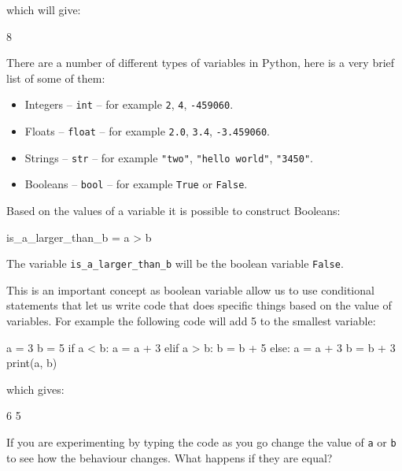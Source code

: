 which will give:

\begin{pyout}
8
\end{pyout}

There are a number of different types of variables in Python, here is a very
brief list of some of them:

\begin{itemize}
    \item Integers -- \texttt{int} -- for example \texttt{2},
        \texttt{4}, \texttt{-459060}.
    \item Floats -- \texttt{float} -- for example \texttt{2.0},
        \texttt{3.4}, \texttt{-3.459060}.
    \item Strings -- \texttt{str} -- for example \texttt{"two"}, \texttt{"hello
        world"}, \texttt{"3450"}.
    \item Booleans -- \texttt{bool} -- for example \texttt{True} or
        \texttt{False}.
\end{itemize}

Based on the values of a variable it is possible to construct Booleans:

\begin{pyin}
is_a_larger_than_b = a > b
\end{pyin}

The variable \texttt{is_a_larger_than_b} will be the boolean variable
\texttt{False}.

This is an important concept as boolean variable allow us to use conditional
statements that let us write code that does specific things based on the value
of variables. For example the following code will add 5 to the smallest
variable:

\begin{pyin}
a = 3
b = 5
if a < b:
    a = a + 3
elif a > b:
    b = b + 5
else:
    a = a + 3
    b = b + 3
print(a, b)
\end{pyin}

which gives:

\begin{pyout}
6 5
\end{pyout}

If you are experimenting by typing the code as you go change the value of
\texttt{a} or \texttt{b} to see how the behaviour changes.
What happens if they are equal?

